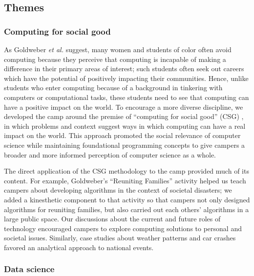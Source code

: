 \subsection{Themes}

\subsubsection{Computing for social good}

As Goldweber \textit{et al.} \cite{Goldweber2013} suggest, many women
and students of color often avoid computing because they perceive
that computing is incapable of making a difference in their primary
areas of interest; such students often seek out
careers which have the potential of positively impacting their
communities.  Hence, unlike students who enter computing because
of a background in tinkering with computers or computational tasks,
these students need to see that computing can have a positive impact
on the world.  To encourage a more diverse discipline, we developed
the camp around the premise of ``computing for social good''
(CSG) \cite{Goldweber2015}, in which problems and context suggest ways
in which computing can have a real impact on the world.  This
approach promoted the social relevance of computer science while
maintaining foundational programming concepts to give campers a
broader and more informed perception of computer science as a whole.

The direct application of the CSG methodology to the camp provided
much of its content. For example, Goldweber's ``Reuniting Families''
activity \cite{Goldweber2012} helped us teach campers about developing algorithms in the
context of societal disasters; we added a kinesthetic component to
that activity so that campers not only designed algorithms for
reuniting families, but also carried out each others' algorithms
in a large public space.  Our discussions about the current and
future roles of technology encouraged campers to explore computing
solutions to personal and societal issues.  Similarly, case studies
about weather patterns and car crashes favored an analytical approach
to national events.

\subsubsection{Data science}

